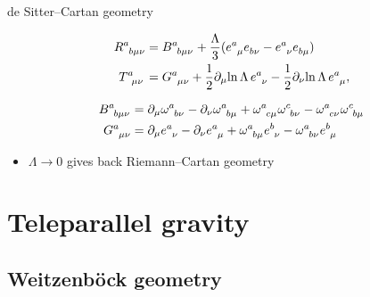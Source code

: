 \documentclass[t,hyperref={bookmarks=false}]{beamer}
\newcommand{\ind}{\indices}
\newcommand{\pd}{\partial}
\newcommand{\bitem}{\begin{itemize}}
\newcommand{\eitem}{\end{itemize}}
\begin{document}
\begin{frame}{de Sitter--Cartan geometry}
\begin{block}{}
\vspace{-\baselineskip}
\begin{align*}
  R\ind{^a_{b\mu\nu}} &= B\ind{^a_{b\mu\nu}} + \frac{\Lambda}{3} 
  (e\ind{^a_\mu} e\ind{_{b\nu}} - e\ind{^a_\nu} e\ind{_{b\mu}})
  \\
  T\ind{^a_{\mu\nu}} &= G\ind{^a_{\mu\nu}} + \frac{1}{2} \pd_\mu 
  \! \ln \Lambda\, e\ind{^a_\nu} - \frac{1}{2} \pd_\nu \! \ln 
  \Lambda\, e\ind{^a_\mu},
\end{align*}
\end{block}

\vspace{-0.22\baselineskip}
\begin{block}{}
\vspace{-\baselineskip}
\begin{align*}
  B\ind{^a_{b\mu\nu}} &= \pd_\mu \omega\ind{^a_{b\nu}} - \pd_\nu 
  \omega\ind{^a_{b\mu}} + \omega\ind{^a_{c\mu}} 
  \omega\ind{^c_{b\nu}} - \omega\ind{^a_{c\nu}} 
  \omega\ind{^c_{b\mu}}\\
  G\ind{^a_{\mu\nu}} &= \pd_\mu e\ind{^a_\nu} - \pd_\nu 
  e\ind{^a_\mu} + \omega\ind{^a_{b\mu}} e\ind{^b_\nu} 
  - \omega\ind{^a_{b\nu}} e\ind{^b_\mu}
\end{align*}
\end{block}

\bitem
\item<2-> $\Lambda \to 0$ gives back Riemann--Cartan geometry
\eitem

\end{frame}

\section{Teleparallel gravity}

\subsection{Weitzenb\"ock geometry}
\end{document}
